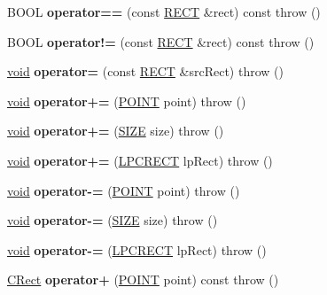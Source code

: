 \begin{DoxyCompactItemize}
B\+O\+OL {\bfseries operator==} (const \hyperlink{structtag_r_e_c_t}{R\+E\+CT} \&rect) const  throw ()
\item 
\mbox{\label{class_c_rect_aeb11a921c684d5ae517bdbd24067155b}} 
B\+O\+OL {\bfseries operator!=} (const \hyperlink{structtag_r_e_c_t}{R\+E\+CT} \&rect) const  throw ()
\item 
\mbox{\label{class_c_rect_aa3281a49aad535581a89480fae04a576}} 
\hyperlink{interfacevoid}{void} {\bfseries operator=} (const \hyperlink{structtag_r_e_c_t}{R\+E\+CT} \&src\+Rect)  throw ()
\item 
\mbox{\label{class_c_rect_acc0e1580b9ec1b3241d11e5bc65d2e72}} 
\hyperlink{interfacevoid}{void} {\bfseries operator+=} (\hyperlink{structtag_p_o_i_n_t}{P\+O\+I\+NT} point)  throw ()
\item 
\mbox{\label{class_c_rect_a794ab288760cf01c0c56852ccfa0f559}} 
\hyperlink{interfacevoid}{void} {\bfseries operator+=} (\hyperlink{structtag_s_i_z_e}{S\+I\+ZE} size)  throw ()
\item 
\mbox{\label{class_c_rect_a5a1fb8277c96fecc2f48650381af8bcb}} 
\hyperlink{interfacevoid}{void} {\bfseries operator+=} (\hyperlink{structtag_r_e_c_t}{L\+P\+C\+R\+E\+CT} lp\+Rect)  throw ()
\item 
\mbox{\label{class_c_rect_a86a53ea6037e774260740ed0987e5835}} 
\hyperlink{interfacevoid}{void} {\bfseries operator-\/=} (\hyperlink{structtag_p_o_i_n_t}{P\+O\+I\+NT} point)  throw ()
\item 
\mbox{\label{class_c_rect_a61e62bce175d1f7ea03546b7c3fa766b}} 
\hyperlink{interfacevoid}{void} {\bfseries operator-\/=} (\hyperlink{structtag_s_i_z_e}{S\+I\+ZE} size)  throw ()
\item 
\mbox{\label{class_c_rect_abcdba62107b5843dfc9c402e7747c23d}} 
\hyperlink{interfacevoid}{void} {\bfseries operator-\/=} (\hyperlink{structtag_r_e_c_t}{L\+P\+C\+R\+E\+CT} lp\+Rect)  throw ()
\item 
\mbox{\label{class_c_rect_ac002077c8a818d82c66c75236997a23e}} 
\hyperlink{class_c_rect}{C\+Rect} {\bfseries operator+} (\hyperlink{structtag_p_o_i_n_t}{P\+O\+I\+NT} point) const  throw ()

\end{DoxyCompactItemize}
